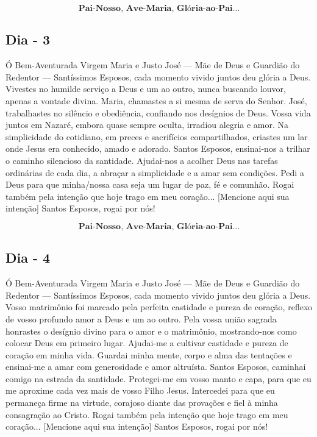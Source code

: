 \documentclass[a4paper,14pt]{extarticle} \usepackage[utf8]{inputenc}
\begin{document}
\[\textbf{Pai-Nosso, Ave-Maria, Glória-ao-Pai...}\]

\subsection{Dia - 3}

Ó Bem-Aventurada Virgem Maria e Justo José — Mãe de Deus e Guardião do Redentor — Santíssimos Esposos, cada momento vivido juntos deu glória a Deus.
Vivestes no humilde serviço a Deus e um ao outro, nunca buscando louvor, apenas a vontade divina. Maria, chamastes a si mesma de serva do Senhor. José, trabalhastes no silêncio e obediência, confiando nos desígnios de Deus. Vossa vida juntos em Nazaré, embora quase sempre oculta, irradiou alegria e amor. Na simplicidade do cotidiano, em preces e sacrifícios compartilhados, criastes um lar onde Jesus era conhecido, amado e adorado. Santos Esposos, ensinai-nos a trilhar o caminho silencioso da santidade. Ajudai-nos a acolher Deus nas tarefas ordinárias de cada dia, a abraçar a simplicidade e a amar sem condições. Pedi a Deus para que minha/nossa casa seja um lugar de paz, fé e comunhão. Rogai também pela intenção que hoje trago em meu coração... [Mencione aqui sua intenção] Santos Esposos, rogai por nós!

\[\textbf{Pai-Nosso, Ave-Maria, Glória-ao-Pai...}\]

\subsection{Dia - 4}

Ó Bem-Aventurada Virgem Maria e Justo José — Mãe de Deus e Guardião do Redentor — Santíssimos Esposos, cada momento vivido juntos deu glória a Deus.
Vosso matrimônio foi marcado pela perfeita castidade e pureza de coração, reflexo de vosso profundo amor a Deus e um ao outro. Pela vossa união sagrada honrastes o desígnio divino para o amor e o matrimônio, mostrando-nos como colocar Deus em primeiro lugar. Ajudai-me a cultivar castidade e pureza de coração em minha vida. Guardai minha mente, corpo e alma das tentações e ensinai-me a amar com generosidade e amor altruísta. Santos Esposos, caminhai comigo na estrada da santidade. Protegei-me em vosso manto e capa, para que eu me aproxime cada vez mais de vosso Filho Jesus. Intercedei para que eu permaneça firme na virtude, corajoso diante das provações e fiel à minha consagração ao Cristo.
Rogai também pela intenção que hoje trago em meu coração... [Mencione aqui sua intenção] Santos Esposos, rogai por nós!
\end{document}
